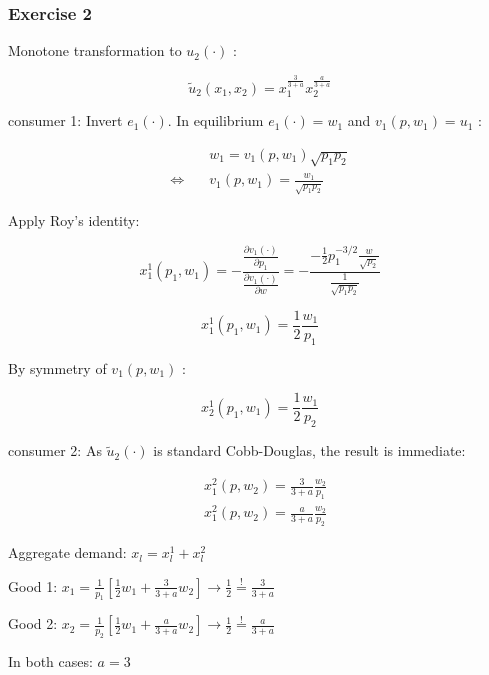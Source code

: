 {
\subsubsection*{Exercise 2}

Monotone transformation to $u_{2}(\cdot)$ :

$$
\tilde{u}_{2}\left(x_{1}, x_{2}\right)=x_{1}^{\frac{3}{3+a}} x_{2}^{\frac{a}{3+a}}
$$

\begin{enumerate}[label=(\alph*)]
{\item
consumer 1: Invert $e_{1}(\cdot)$. In equilibrium $e_{1}(\cdot)=w_{1}$ and $v_{1}\left(p, w_{1}\right)=u_{1}$ :

$$
\begin{aligned}
& w_{1}=v_{1}\left(p, w_{1}\right) \sqrt{p_{1} p_{2}} \\
\Leftrightarrow \quad & v_{1}\left(p, w_{1}\right)=\frac{w_{1}}{\sqrt{p_{1} p_{2}}}
\end{aligned}
$$

Apply Roy's identity:

$$
x_{1}^{1}\left(p_{1}, w_{1}\right)=-\frac{\frac{\partial v_{1}(\cdot)}{\partial p_{1}}}{\frac{\partial v_{1}(\cdot)}{\partial w}}=-\frac{-\frac{1}{2} p_{1}^{-3/2} \frac{w}{\sqrt{p_{2}}}}{\frac{1}{\sqrt{p_{1} p_{2}}}}
$$

$$
x_{1}^{1}\left(p_{1}, w_{1}\right)=\frac{1}{2} \frac{w_{1}}{p_{1}}
$$

By symmetry of $v_{1}\left(p, w_{1}\right)$ :

$$
x_{2}^{1}\left(p_{1}, w_{1}\right)=\frac{1}{2} \frac{w_{1}}{p_{2}}
$$

consumer 2: As $\tilde{u}_2(\cdot)$ is standard Cobb-Douglas, the result is immediate:

$$
\begin{aligned}
& x_{1}^{2}\left(p, w_{2}\right)=\frac{3}{3+a} \frac{w_{2}}{p_{1}} \\
& x_{1}^{2}\left(p, w_{2}\right)=\frac{a}{3+a} \frac{w_{2}}{p_{2}}
\end{aligned}
$$
}
{\item 
Aggregate demand: $x_{l}=x_{l}^{1}+x_{l}^{2}$

Good 1: $x_{1}=\frac{1}{p_{1}}\left[\frac{1}{2} w_{1}+\frac{3}{3+a} w_{2}\right] \rightarrow \frac{1}{2} \stackrel{!}{=} \frac{3}{3+a}$

Good 2: $x_{2}=\frac{1}{p_{2}}\left[\frac{1}{2} w_{1}+\frac{a}{3+a} w_{2}\right] \rightarrow \frac{1}{2} \stackrel{!}{=} \frac{a}{3+a}$

In both cases: $a=3$
}
\end{enumerate}
}
